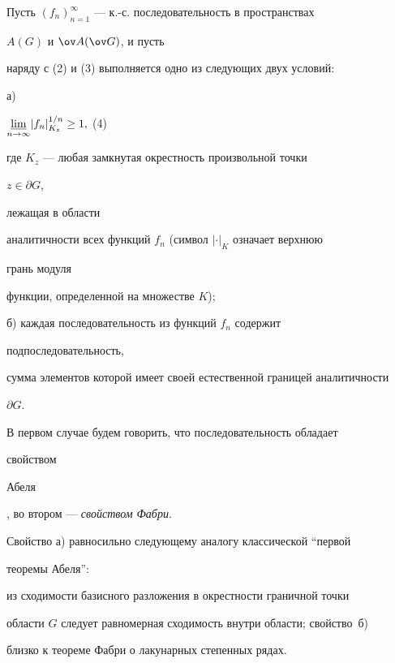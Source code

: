  


Пусть $(f_n)^\infty_{n=1}$ --- к.-с. последовательность в пространствах 


$A(G)$ и $\ov A(\ov G)$, и пусть 


наряду с (2) и (3) выполняется одно из следующих двух условий: 


\smallskip


 


а) \hfill 


$\underset{n\to\infty}{\varliminf}{}|f_n|^{1/n}_{K_z}\ge1,$ \hfill (4) 


\addtocounter{equation}{1}


\smallskip


 


\noindent{}где $K_z$ --- любая замкнутая окрестность произвольной точки 


$z\in\partial G$, 


лежащая в области 


аналитичности всех функций $f_n$ (символ $|\cdot|_K$ означает верхнюю 


грань модуля 


функции, определенной на множестве $K$); 


 


б) каждая последовательность из функций $f_n$ содержит 


подпоследовательность, 


сумма элементов которой имеет своей естественной границей аналитичности 


$\partial G$. 


 


В первом случае будем говорить, что последовательность обладает {\it 


свойством 


Абеля}, во втором --- {\it свойством Фабри}. 


 


\begin{note} 


Свойство а) равносильно следующему аналогу классической ``первой 


теоремы Абеля'': 


из сходимости базисного разложения в окрестности граничной точки 


области $G$ следует равномерная сходимость внутри области; свойство~б) 


близко к теореме Фабри о лакунарных степенных рядах. 


\end{note} 


